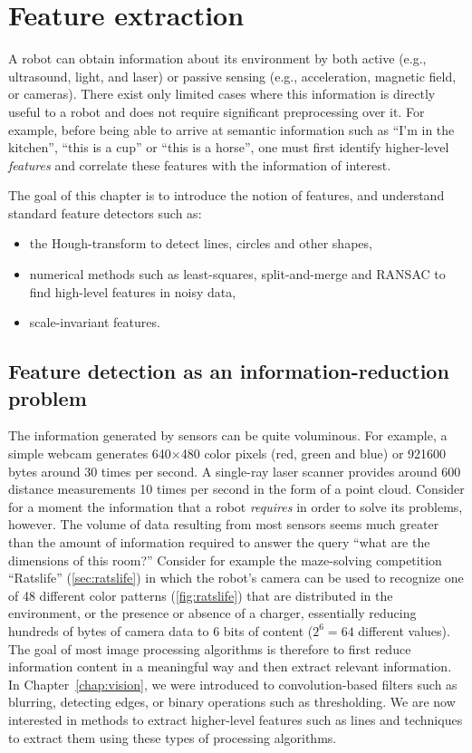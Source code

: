 \chapter{Feature extraction}\label{chap:feature_extraction}

A robot can obtain information about its environment by both active (e.g., ultrasound, light, and laser) or passive sensing (e.g., acceleration, magnetic field, or cameras). There exist only limited cases where this information is directly useful to a robot and does not require significant preprocessing over it. For example, before being able to arrive at semantic information such as ``I'm in the kitchen'', ``this is a cup'' or ``this is a horse'', one must first identify higher-level \textsl{features} and correlate these features with the information of interest.

The goal of this chapter is to introduce the notion of features, and understand standard feature detectors such as:

\begin{itemize}
    \item the Hough-transform to detect lines, circles and other shapes,
    \item numerical methods such as least-squares, split-and-merge and RANSAC to find high-level features in noisy data,
    \item scale-invariant features.
\end{itemize}

\section{Feature detection as an information-reduction problem}
The information generated by sensors can be quite voluminous. For example, a simple webcam generates 640$\times$480 color pixels (red, green and blue) or 921600 bytes around 30 times per second. A single-ray laser scanner provides around 600 distance measurements 10 times per second in the form of a point cloud. Consider for a moment the information that a robot \emph{requires} in order to solve its problems, however. The volume of data resulting from most sensors seems much greater than the amount of information required to answer the query ``what are the dimensions of this room?'' Consider for example the maze-solving competition ``Ratslife'' (\cref{sec:ratslife}) in which the robot's camera can be used to recognize one of 48 different color patterns (\cref{fig:ratslife}) that are distributed in the environment, or the presence or absence of a charger, essentially reducing hundreds of bytes of camera data to 6 bits of content ($2^6=64$ different values). The goal of most image processing algorithms is therefore to first reduce information content in a meaningful way and then extract relevant information. In Chapter~\ref{chap:vision}, we were introduced to convolution-based filters such as blurring, detecting edges, or binary operations such as thresholding. We are now interested in methods to extract higher-level features such as lines and techniques to extract them using these types of processing algorithms.

